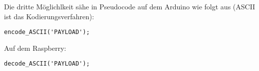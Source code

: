 Die dritte Möglichlkeit sähe in Pseudocode auf dem Arduino wie folgt aus (ASCII ist das Kodierungsverfahren):
\lstset{language=c}
\begin{lstlisting}
encode_ASCII('PAYLOAD');
\end{lstlisting}
Auf dem Raspberry:
\lstset{language=c}
\begin{lstlisting}
decode_ASCII('PAYLOAD');
\end{lstlisting}
